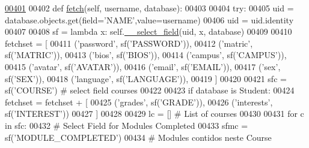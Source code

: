 \begin{DoxyCode}
\hypertarget{classProfile_1_1ProfileUnit_1_1PersProfile_l00401}{}\hyperlink{classProfile_1_1ProfileUnit_1_1PersProfile_aca301abc09bc12a7cf0a61437f941a8a}{00401} 
00402     \textcolor{keyword}{def }\hyperlink{classProfile_1_1ProfileUnit_1_1PersProfile_aca301abc09bc12a7cf0a61437f941a8a}{fetch}(self, username, database):
00403 
00404         \textcolor{keywordflow}{try}:
00405             uid = database.objects.get(field=\textcolor{stringliteral}{'NAME'},value=username)
00406             uid = uid.identity
00407 
00408             sf = \textcolor{keyword}{lambda} x: self.\hyperlink{classProfile_1_1ProfileUnit_1_1PersProfile_a48bc2c04d89772752559fc19dc79f321}{\_\_select\_field}(uid, x, database)
00409 
00410             fetchset = [
00411                     (\textcolor{stringliteral}{'password'},    sf(\textcolor{stringliteral}{'PASSWORD'})),
00412                     (\textcolor{stringliteral}{'matric'},      sf(\textcolor{stringliteral}{'MATRIC'})),
00413                     (\textcolor{stringliteral}{'bios'},        sf(\textcolor{stringliteral}{'BIOS'})),
00414                     (\textcolor{stringliteral}{'campus'},      sf(\textcolor{stringliteral}{'CAMPUS'})),
00415                     (\textcolor{stringliteral}{'avatar'},      sf(\textcolor{stringliteral}{'AVATAR'})),
00416                     (\textcolor{stringliteral}{'email'},       sf(\textcolor{stringliteral}{'EMAIL'})),
00417                     (\textcolor{stringliteral}{'sex'},         sf(\textcolor{stringliteral}{'SEX'})),
00418                     (\textcolor{stringliteral}{'language'},    sf(\textcolor{stringliteral}{'LANGUAGE'})),
00419             ]
00420 
00421             sfc = sf(\textcolor{stringliteral}{'COURSE'}) \textcolor{comment}{# select field courses}
00422 
00423             \textcolor{keywordflow}{if} database \textcolor{keywordflow}{is} Student:
00424                 fetchset = fetchset + [     
00425                     (\textcolor{stringliteral}{'grades'},      sf(\textcolor{stringliteral}{'GRADE'})),
00426                     (\textcolor{stringliteral}{'interests'},   sf(\textcolor{stringliteral}{'INTEREST'}))
00427                 ]
00428 
00429                 lc = [] \textcolor{comment}{# List of courses}
00430                 
00431                 \textcolor{keywordflow}{for} c \textcolor{keywordflow}{in} sfc:
00432                     \textcolor{comment}{# Select Field for Modules Completed}
00433                     sfmc = sf(\textcolor{stringliteral}{'MODULE\_COMPLETED'})
00434                     \textcolor{comment}{# Modules contidos neste Course}

\end{DoxyCode}
